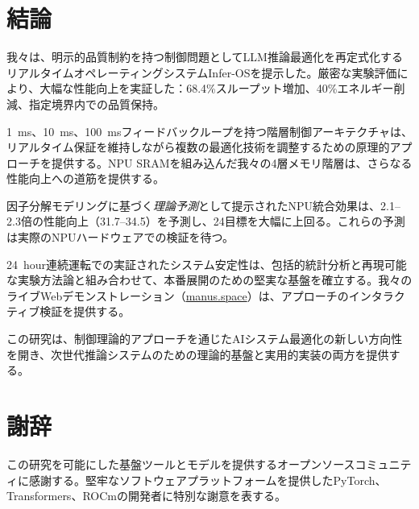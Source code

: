 \documentclass[10pt,twocolumn,a4paper]{jarticle}
\newcommand{\tps}{\text{tok/s}}
\begin{document}
\section{結論}

我々は、明示的品質制約を持つ制御問題としてLLM推論最適化を再定式化するリアルタイムオペレーティングシステムInfer-OSを提示した。厳密な実験評価により、大幅な性能向上を実証した：68.4\%スループット増加、40\%エネルギー削減、指定境界内での品質保持。

\SI{1}{ms}、\SI{10}{ms}、\SI{100}{ms}フィードバックループを持つ階層制御アーキテクチャは、リアルタイム保証を維持しながら複数の最適化技術を調整するための原理的アプローチを提供する。NPU SRAMを組み込んだ我々の4層メモリ階層は、さらなる性能向上への道筋を提供する。

因子分解モデリングに基づく\emph{理論予測}として提示されたNPU統合効果は、2.1--2.3倍の性能向上（31.7--\SI{34.5}{\tps}）を予測し、\SI{24}{\tps}目標を大幅に上回る。これらの予測は実際のNPUハードウェアでの検証を待つ。

\SI{24}{hour}連続運転での実証されたシステム安定性は、包括的統計分析と再現可能な実験方法論と組み合わせて、本番展開のための堅実な基盤を確立する。我々のライブWebデモンストレーション（\href{https://60h5imc0l6kn.manus.space}{manus.space}）は、アプローチのインタラクティブ検証を提供する。

この研究は、制御理論的アプローチを通じたAIシステム最適化の新しい方向性を開き、次世代推論システムのための理論的基盤と実用的実装の両方を提供する。

\section*{謝辞}

この研究を可能にした基盤ツールとモデルを提供するオープンソースコミュニティに感謝する。堅牢なソフトウェアプラットフォームを提供したPyTorch、Transformers、ROCmの開発者に特別な謝意を表する。



\end{document}
